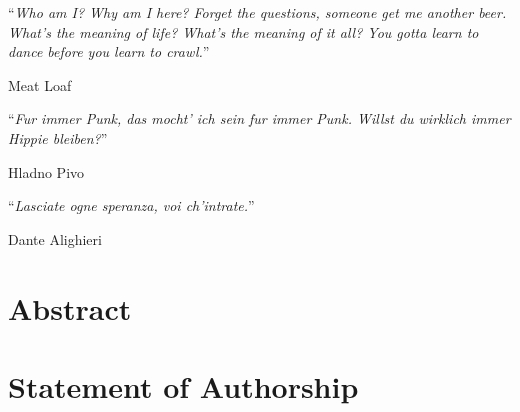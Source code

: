 \documentclass[twoside,openright,titlepage,numbers=noenddot,headinclude,footinclude=true,cleardoublepage=empty,listof=totoc,paper=a4,fontsize=12pt,australian,twoside=semi,DIV=calc]{scrreprt}
\begin{document}
  \frenchspacing
  \raggedbottom
  \renewcommand*{\thefootnote}{\fnsymbol{footnote}}
  \pagestyle{plain}
 
  \singlespacing
  
  
  
  \onehalfspacing
  


\vspace*{0.2\textheight}

\noindent\enquote{\itshape Who am I? Why am I here?
Forget the questions, someone get me another beer.
What's the meaning of life? What's the meaning of it all?
You gotta learn to dance before you learn to crawl.}\bigbreak

\hfill Meat Loaf

\vspace*{0.2\textheight}

\noindent\enquote{\itshape Fur immer Punk, das mocht' ich sein fur immer Punk. Willst du wirklich immer Hippie bleiben?}\bigbreak

\hfill Hladno Pivo

\vspace*{0.2\textheight}

\noindent\enquote{\itshape Lasciate ogne speranza, voi ch'intrate.}\bigbreak

\hfill Dante Alighieri

  

  \chapter*{Abstract}
  
  
  \chapter*{Statement of Authorship}
  
  
  
  
  
%

  \cleardoublepage
  \pagestyle{scrheadings}
  \onehalfspacing
  
\end{document}
